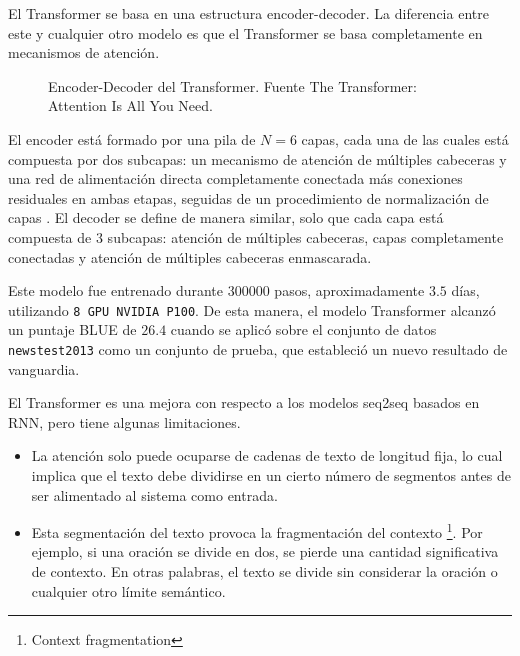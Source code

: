 \documentclass[conference]{IEEEtran}
\begin{document}
\vspace{0.2cm}

El Transformer se basa en una estructura encoder-decoder. La diferencia entre este y cualquier otro modelo es que el Transformer se basa completamente en mecanismos de atenci\'on. 

\begin{figure}[h]
\caption{Encoder-Decoder del Transformer. Fuente The Transformer:
Attention Is All You Need. \cite{b1}}
\end{figure}

\vspace{0.2cm}


El encoder est\'a formado por una pila de $N = 6$ capas, cada una de las cuales est\'a compuesta por dos subcapas: un mecanismo de atenci\'on de m\'ultiples cabeceras y una red de alimentaci\'on directa completamente conectada m\'as conexiones residuales \cite{b2} en ambas etapas, seguidas de un procedimiento de normalizaci\'on de capas \cite{b3}. El decoder se define de manera similar, solo que cada capa est\'a compuesta de 3 subcapas: atenci\'on de m\'ultiples cabeceras, capas completamente conectadas y atenci\'on de m\'ultiples cabeceras enmascarada.

\vspace{0.2cm}

Este modelo fue entrenado durante $300000$ pasos, aproximadamente $3.5$ d\'ias, utilizando \texttt{8 GPU NVIDIA P100}. De esta manera, el modelo Transformer alcanz\'o un puntaje BLUE \cite{b4} de $26.4$ cuando se aplic\'o sobre el conjunto de datos \texttt{newstest2013} como un conjunto de prueba, que estableci\'o un nuevo resultado de vanguardia.
\vspace{0.2cm}

El Transformer es una mejora con respecto a los modelos seq2seq basados en RNN, pero tiene algunas limitaciones.

\begin{itemize}
\item La atenci\'on solo puede ocuparse de cadenas de texto de longitud fija, lo cual implica que el texto debe dividirse en un cierto n\'umero de segmentos antes de ser alimentado al sistema como entrada. 

\item Esta segmentaci\'on del texto provoca la fragmentaci\'on del contexto \footnote{Context fragmentation}. Por ejemplo, si una oraci\'on se divide en dos, se pierde una cantidad significativa de contexto. En otras palabras, el texto se divide sin considerar la oraci\'on o cualquier otro l\'imite sem\'antico.
\end{itemize}
\end{document}
